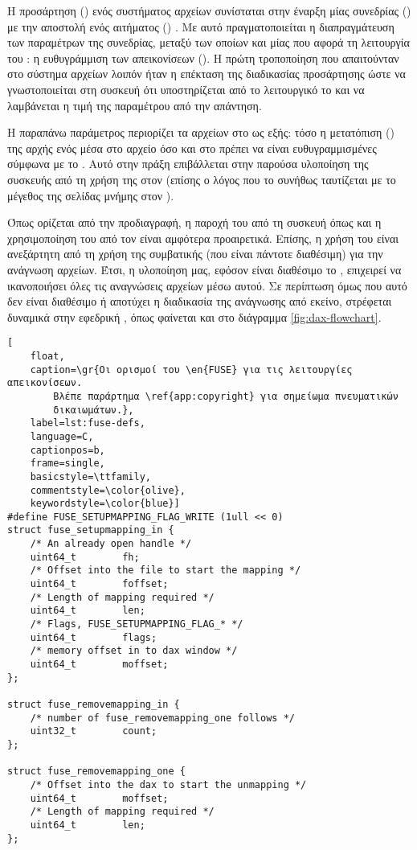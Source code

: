 Η προσάρτηση () ενός \viofs{} συστήματος αρχείων συνίσταται στην
έναρξη μίας  συνεδρίας () με την αποστολή ενός
 αιτήματος () \cite{virtio}. Με αυτό πραγματοποιείται
η διαπραγμάτευση των παραμέτρων της συνεδρίας, μεταξύ των οποίων και μίας που
αφορά τη λειτουργία του : η ευθυγράμμιση των απεικονίσεων
(). Η πρώτη τροποποίηση που απαιτούνταν στο σύστημα αρχείων
λοιπόν ήταν η επέκταση της διαδικασίας προσάρτησης ώστε να γνωστοποιείται στη
συσκευή ότι υποστηρίζεται από το λειτουργικό το  και να
λαμβάνεται η τιμή της παραμέτρου από την απάντηση.

Η παραπάνω παράμετρος περιορίζει τα  αρχείων στο  ως
εξής: τόσο η μετατόπιση () της αρχής ενός  μέσα στο
αρχείο όσο και στο  πρέπει να είναι ευθυγραμμισμένες σύμφωνα με
το . Αυτό στην πράξη επιβάλλεται στην παρούσα υλοποίηση της
\viofs{} συσκευής από τη χρήση της  \cite{man:mmap} στον \host{}
(επίσης ο λόγος που το  συνήθως ταυτίζεται με το μέγεθος της
σελίδας μνήμης στον \host{}).

Όπως ορίζεται από την προδιαγραφή, η παροχή του  από τη συσκευή
όπως και η χρησιμοποίηση του από τον \guest{} είναι αμφότερα προαιρετικά.
Επίσης, η χρήση του  είναι ανεξάρτητη από τη χρήση της συμβατικής
 (που είναι πάντοτε διαθέσιμη) για την ανάγνωση αρχείων. Έτσι, η
υλοποίηση μας, εφόσον είναι διαθέσιμο το , επιχειρεί να
ικανοποιήσει όλες τις αναγνώσεις αρχείων μέσω αυτού. Σε περίπτωση όμως που αυτό
δεν είναι διαθέσιμο ή αποτύχει η διαδικασία της ανάγνωσης από εκείνο, στρέφεται
δυναμικά στην εφεδρική , όπως φαίνεται και στο διάγραμμα
\ref{fig:dax-flowchart}.

\begin{otherlanguage}{english}
\begin{lstlisting}[
    float,
    caption=\gr{Οι ορισμοί του \en{FUSE} για τις λειτουργίες απεικονίσεων.
        Βλέπε παράρτημα \ref{app:copyright} για σημείωμα πνευματικών
        δικαιωμάτων.},
    label=lst:fuse-defs,
    language=C,
    captionpos=b,
    frame=single,
    basicstyle=\ttfamily,
    commentstyle=\color{olive},
    keywordstyle=\color{blue}]
#define FUSE_SETUPMAPPING_FLAG_WRITE (1ull << 0)
struct fuse_setupmapping_in {
    /* An already open handle */
    uint64_t        fh;
    /* Offset into the file to start the mapping */
    uint64_t        foffset;
    /* Length of mapping required */
    uint64_t        len;
    /* Flags, FUSE_SETUPMAPPING_FLAG_* */
    uint64_t        flags;
    /* memory offset in to dax window */
    uint64_t        moffset;
};

struct fuse_removemapping_in {
    /* number of fuse_removemapping_one follows */
    uint32_t        count;
};

struct fuse_removemapping_one {
    /* Offset into the dax to start the unmapping */
    uint64_t        moffset;
    /* Length of mapping required */
    uint64_t        len;
};
\end{lstlisting}
\end{otherlanguage}

